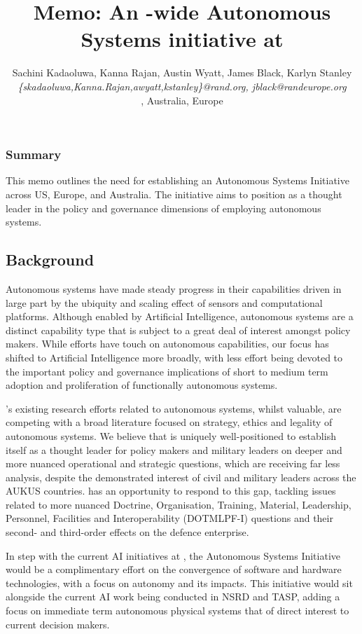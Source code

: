 \documentclass[11pt,letterpaper]{article}
\title{Memo: An \auke-wide Autonomous Systems initiative at \org}
\author{\textsf{\large{Sachini Kadaoluwa, Kanna Rajan, Austin Wyatt,
      James Black, Karlyn Stanley}}\\
  \emph{\{skadaoluwa,Kanna.Rajan,awyatt,kstanley\}@rand.org, jblack@randeurope.org}\\
  \orge, \org Australia, \org Europe
  }
\begin{document}
\maketitle{}

\subsubsection{Summary}

This memo outlines the need for establishing an Autonomous Systems
Initiative across \org US, Europe, and Australia. The initiative aims
to position \org as a thought leader in the policy and governance
dimensions of employing autonomous systems.

\subsection{Background}

Autonomous systems have made steady progress in their capabilities driven in large part by the ubiquity and scaling effect of sensors and computational platforms. Although enabled by Artificial Intelligence, autonomous systems are a distinct capability type that is subject to a great deal of interest amongst policy makers. While \org efforts have touch on autonomous capabilities, our focus has shifted to Artificial Intelligence more broadly, with less effort being devoted to the important policy and governance implications of short to medium term adoption and proliferation of functionally autonomous systems. 
\par
\org’s existing research efforts related to autonomous systems, whilst valuable, are competing with a broad literature focused on strategy, ethics and legality of autonomous systems. We believe that \org is uniquely well-positioned to establish itself as a thought leader for policy makers and military leaders on deeper and more nuanced operational and strategic questions, which are receiving far less analysis, despite the demonstrated interest of civil and military leaders across the AUKUS countries.  \org has an opportunity to respond to this gap, tackling issues related to more nuanced Doctrine, Organisation, Training, Material, Leadership, Personnel, Facilities and Interoperability (DOTMLPF-I) questions and their second- and third-order effects on the defence enterprise.
\par
In step with the current AI initiatives at \org, the Autonomous Systems Initiative would be a complimentary effort on the convergence of software and hardware technologies, with a focus on autonomy and its impacts. This initiative would sit alongside the current AI work being conducted in NSRD and TASP, adding a focus on immediate term autonomous physical systems that of direct interest to current decision makers.
\end{document}
